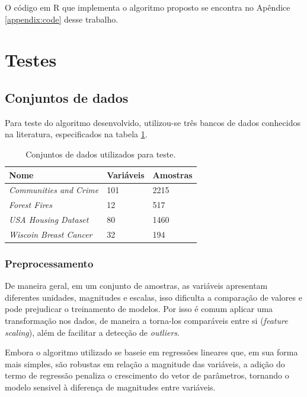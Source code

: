 O código em R que implementa o algoritmo proposto se encontra no Apêndice \ref{appendix:code} desse trabalho.

\section{Testes}

\subsection{Conjuntos de dados}

Para teste do algoritmo desenvolvido, utilizou-se três bancos de dados conhecidos na literatura, 
especificados na tabela \ref{tbl:datasets}.
\begin{table}[H]
    \caption{Conjuntos de dados utilizados para teste.}
    \centering
    \begin{tabular}{@{}lll@{}}
    \toprule
    Nome                           & Variáveis & Amostras \\ \midrule
    \textit{Communities and Crime} & 101       & 2215     \\
    \textit{Forest Fires}          & 12        & 517      \\
    \textit{USA Housing Dataset}   & 80        & 1460     \\
    \textit{Wiscoin Breast Cancer} & 32        & 194      \\ \bottomrule
    \end{tabular}
    \label{tbl:datasets}
\end{table}

\subsubsection{Preprocessamento}

De maneira geral, em um conjunto de amostras, as variáveis apresentam diferentes unidades, magnitudes e escalas, isso dificulta a comparação de valores e pode prejudicar o treinamento de modelos. Por isso é comum aplicar uma transformação nos dados, de maneira a torna-los comparáveis entre si (\textit{feature scaling}), além de facilitar a detecção de \textit{outliers}.

Embora o algoritmo utilizado se baseie em regressões lineares que, em sua forma mais simples, são robustas em  relação a magnitude das variáveis, a adição do termo de regressão penaliza o crescimento do vetor de parâmetros, tornando o modelo sensivel à diferença de magnitudes entre variáveis.


